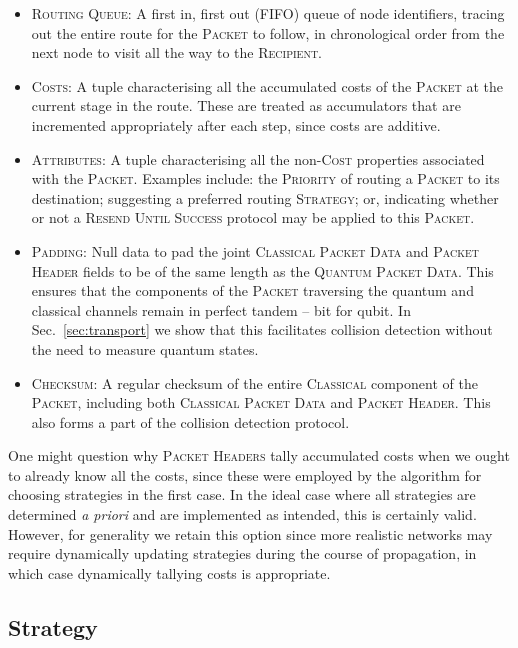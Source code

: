 \documentclass[aps, rmp, twocolumn, amsmath, amssymb, nofootinbib, superscriptaddress, longbibliography, floatfix, table-of-contents, eqsecnum]{revtex4-1}
\begin{document}
\begin{itemize}
    \item \textsc{Routing Queue}: A first in, first out (FIFO) queue of node identifiers, tracing out the entire route for the \textsc{Packet} to follow, in chronological order from the next node to visit all the way to the \textsc{Recipient}.
    \item \textsc{Costs}: A tuple characterising all the accumulated costs of the \textsc{Packet} at the current stage in the route. These are treated as accumulators that are incremented appropriately after each step, since costs are additive.
    \item \textsc{Attributes}: A tuple characterising all the non-\textsc{Cost} properties associated with the \textsc{Packet}. Examples include: the \textsc{Priority} of routing a \textsc{Packet} to its destination; suggesting a preferred routing \textsc{Strategy}; or, indicating whether or not a \textsc{Resend Until Success} protocol may be applied to this \textsc{Packet}.
    \item \textsc{Padding}: Null data to pad the joint \textsc{Classical Packet Data} and \textsc{Packet Header} fields to be of the same length as the \textsc{Quantum Packet Data}. This ensures that the components of the \textsc{Packet} traversing the quantum and classical channels remain in perfect tandem -- bit for qubit. In Sec.~\ref{sec:transport} we show that this facilitates collision detection without the need to measure quantum states.
    \item \textsc{Checksum}: A regular checksum of the entire \textsc{Classical} component of the \textsc{Packet}, including both \textsc{Classical Packet Data} and \textsc{Packet Header}. This also forms a part of the collision detection protocol.
\end{itemize}

One might question why \textsc{Packet Headers} tally accumulated costs when we ought to already know all the costs, since these were employed by the algorithm for choosing strategies in the first case. In the ideal case where all strategies are determined \textit{a priori} and are implemented as intended, this is certainly valid. However, for generality we retain this option since more realistic networks may require dynamically updating strategies during the course of propagation, in which case dynamically tallying costs is appropriate.

%
%

\subsection{Strategy} \label{sec:into_strat} 
\end{document}
